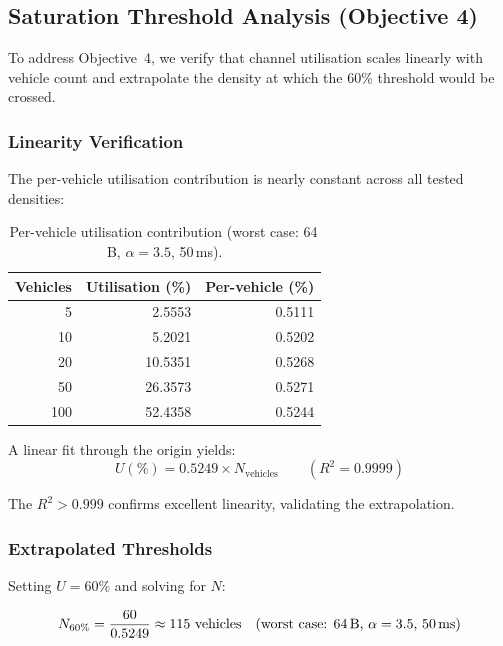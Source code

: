 \documentclass[12pt, a4paper]{article}
\begin{document}
\subsection{Saturation Threshold Analysis (Objective 4)}

To address Objective~4, we verify that channel utilisation scales linearly
with vehicle count and extrapolate the density at which the 60\%
threshold would be crossed.

\subsubsection{Linearity Verification}

The per-vehicle utilisation contribution is nearly constant across all
tested densities:

\begin{table}[H]
\centering
\caption{Per-vehicle utilisation contribution (worst case: 64\,B, $\alpha = 3.5$, 50\,ms).}
\label{tab:linearity}
\begin{tabular}{r r r}
    \toprule
    \textbf{Vehicles} & \textbf{Utilisation (\%)} & \textbf{Per-vehicle (\%)} \\
    \midrule
    5   & 2.5553  & 0.5111 \\
    10  & 5.2021  & 0.5202 \\
    20  & 10.5351 & 0.5268 \\
    50  & 26.3573 & 0.5271 \\
    100 & 52.4358 & 0.5244 \\
    \bottomrule
\end{tabular}
\end{table}

A linear fit through the origin yields:
\begin{equation}
    U(\%) = 0.5249 \times N_{\text{vehicles}} \qquad (R^2 = 0.9999)
    \label{eq:linear_fit}
\end{equation}

The $R^2 > 0.999$ confirms excellent linearity, validating the extrapolation.

\subsubsection{Extrapolated Thresholds}

Setting $U = 60\%$ and solving for $N$:

\begin{equation}
    N_{60\%} = \frac{60}{0.5249} \approx 115~\text{vehicles}
    \quad\text{(worst case: 64\,B, } \alpha = 3.5\text{, 50\,ms)}
\end{equation}
\end{document}
